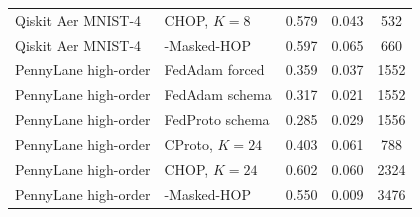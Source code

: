 \begin{table}[t]
\begin{tabular}{llccc}
Qiskit Aer MNIST-4 & CHOP, \(K=8\) & 0.579 & 0.043 & 532 \\
Qiskit Aer MNIST-4 & \method{}-Masked-HOP & 0.597 & 0.065 & 660 \\
\midrule
PennyLane high-order & FedAdam forced & 0.359 & 0.037 & 1552 \\
PennyLane high-order & FedAdam schema & 0.317 & 0.021 & 1552 \\
PennyLane high-order & FedProto schema & 0.285 & 0.029 & 1556 \\
PennyLane high-order & CProto, \(K=24\) & 0.403 & 0.061 & 788 \\
PennyLane high-order & CHOP, \(K=24\) & 0.602 & 0.060 & 2324 \\
PennyLane high-order & \method{}-Masked-HOP & 0.550 & 0.009 & 3476 \\
\bottomrule
\end{tabular}
\end{table}
